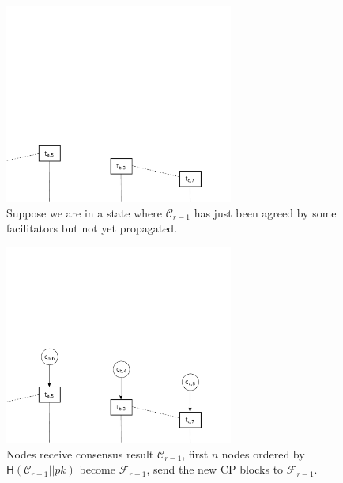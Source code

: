 \documentclass{beamer}
\newcommand{\C}{\mathcal{C}}
\newcommand{\F}{\mathcal{F}}
\begin{document}
\begin{frame}{\subsecname}
  \begin{figure}[h]
  \includegraphics[width=0.67\textwidth]{trustchain-1}
  \centering
  \caption*{Suppose we are in a state where $\C_{r - 1}$ has just been agreed by some facilitators but not yet propagated.}
  \end{figure}
\end{frame}

\begin{frame}{\subsecname}
  \begin{figure}[h]
  \includegraphics[width=0.67\textwidth]{trustchain-2}
  \centering
  \caption*{Nodes receive consensus result $\C_{r - 1}$,
    first $n$ nodes ordered by $\textsf{H}(\C_{r-1} || pk)$ become $\F_{r-1}$,
    send the new CP blocks to $\F_{r-1}$.}
  \end{figure}
\end{frame}
\end{document}
